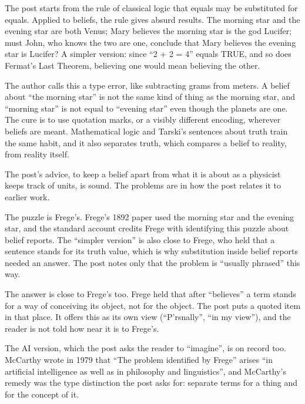 \begin{afterword}
\summaryhead

The post starts from the rule of classical logic that equals may be substituted for equals. Applied to beliefs, the rule gives absurd results. The morning star and the evening star are both Venus; Mary believes the morning star is the god Lucifer; must John, who knows the two are one, conclude that Mary believes the evening star is Lucifer? A simpler version: since ``2 + 2 = 4'' equals TRUE, and so does Fermat's Last Theorem, believing one would mean believing the other.

The author calls this a type error, like subtracting grams from meters. A belief about ``the morning star'' is not the same kind of thing as the morning star, and ``morning star'' is not equal to ``evening star'' even though the planets are one. The cure is to use quotation marks, or a visibly different encoding, wherever beliefs are meant. Mathematical logic and Tarski's sentences about truth train the same habit, and it also separates truth, which compares a belief to reality, from reality itself.

\responsehead

The post's advice, to keep a belief apart from what it is about as a physicist keeps track of units, is sound. The problems are in how the post relates it to earlier work.

The puzzle is Frege's. Frege's 1892 paper used the morning star and the evening star, and the standard account credits Frege with identifying this puzzle about belief reports. The ``simpler version'' is also close to Frege, who held that a sentence stands for its truth value, which is why substitution inside belief reports needed an answer. The post notes only that the problem is ``usually phrased'' this way.

The answer is close to Frege's too. Frege held that after ``believes'' a term stands for a way of conceiving its object, not for the object. The post puts a quoted item in that place. It offers this as its own view (``P'rsnally'', ``in my view''), and the reader is not told how near it is to Frege's.

The AI version, which the post asks the reader to ``imagine'', is on record too. McCarthy wrote in 1979 that ``The problem identified by Frege'' arises ``in artificial intelligence as well as in philosophy and linguistics'', and McCarthy's remedy was the type distinction the post asks for: separate terms for a thing and for the concept of it.


\end{afterword}
